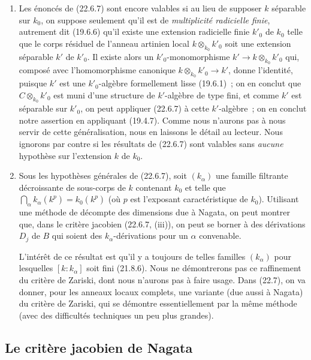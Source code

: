 \begin{remark}[22.6.9]
\label{0.22.6.9-fr}
\begin{enumerate}
  \item[\rm(i)] Les énoncés de (22.6.7) sont encore valables si au lieu de
  supposer $k$ séparable sur $k_0$, on suppose seulement qu'il est de
  \emph{multiplicité radicielle finie}, autrement dit (19.6.6) qu'il existe
  une extension radicielle finie $k'_0$ de $k_0$ telle que le corps résiduel de
  l'anneau artinien local $k\otimes_{k_0}k'_0$ soit une extension séparable
  $k'$ de $k'_0$. Il existe alors un $k'_0$-monomorphisme
  $k'\longrightarrow k\otimes_{k_0}k'_0$ qui, composé avec l'homomorphisme
  canonique $k\otimes_{k_0}k'_0\longrightarrow k'$, donne l'identité, puisque
  $k'$ est une $k'_0$-algèbre formellement lisse (19.6.1)~; on en conclut que
  $C\otimes_{k_0}k'_0$ est muni d'une structure de $k'$-algèbre de type fini,
  et comme $k'$ est séparable sur $k'_0$, on peut appliquer (22.6.7) à cette
  $k'$-algèbre~; on en conclut notre assertion en appliquant (19.4.7). Comme
  nous n'aurons pas à nous servir de cette généralisation, nous en laissons le
  détail au lecteur. Nous ignorons par contre si les résultats de (22.6.7) sont
  valables sans \emph{aucune} hypothèse sur l'extension $k$ de $k_0$.
  \item[\rm(ii)] Sous les hypothèses générales de (22.6.7), soit $(k_\alpha)$
  une famille filtrante décroissante de sous-corps de $k$ contenant $k_0$ et
  telle que
  $\bigcap_\alpha k_\alpha(k^p)=k_0(k^p)$ (où $p$ est l'exposant
  caractéristique de $k_0$). Utilisant une méthode de décompte des dimensions
  due à Nagata, on peut montrer que, dans le critère jacobien (22.6.7, (iii)),
  on peut se borner à des dérivations $D_j$ de $B$ qui soient des
  $k_\alpha$-dérivations pour un $\alpha$ convenable.


  L'intérêt de ce résultat est qu'il y a toujours de telles familles
  $(k_\alpha)$ pour lesquelles $[k:k_\alpha]$ soit fini (21.8.6). Nous ne
  démontrerons pas ce raffinement du critère de Zariski, dont nous n'aurons pas
  à faire usage. Dans (22.7), on va donner, pour les anneaux locaux complets,
  une variante (due aussi à Nagata) du critère de Zariski, qui se démontre
  essentiellement par la même méthode (avec des difficultés techniques un peu
  plus grandes).
\end{enumerate}
\end{remark}

\subsection{Le critère jacobien de Nagata}
\label{subsection:0.22.7-fr}

